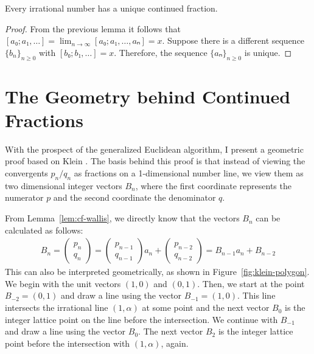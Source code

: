 \begin{theorem}
  \label{thm:irrat-cf}
  Every irrational number has a unique continued fraction.
\end{theorem}

\begin{proof}
  From the previous lemma it follows that $[a₀; a₁, …] = \lim_{n → ∞} [a₀; a₁, …, aₙ] = x$.
  Suppose there is a different sequence $\{b_n\}_{n ≥ 0}$ with $[b₀; b₁, …] = x$.
  Therefore, the sequence $\{aₙ\}_{n ≥ 0}$ is unique.
\end{proof}

\section{The Geometry behind Continued Fractions}

With the prospect of the generalized Euclidean algorithm, I present a geometric
proof based on Klein \cite{Klein95}.
The basis behind this proof is that instead of viewing the convergents $p_n/q_n$ as
fractions on a 1-dimensional number line,
we view them as two dimensional integer vectors $B_n$, where the first coordinate
represents the numerator $p$ and the second coordinate the denominator $q$.

From Lemma~\ref{lem:cf-wallis},
we directly know that the vectors $B_n$ can be calculated as follows:
\begin{align*}
  B_n =
  \begin{pmatrix}
    p_n \\ q_n
  \end{pmatrix}
  =
  \begin{pmatrix}
    p_{n-1} \\ q_{n-1}
  \end{pmatrix}
  a_n
  +
  \begin{pmatrix}
    p_{n-2} \\ q_{n-2}
  \end{pmatrix}
  = B_{n-1} a_n + B_{n-2}
\end{align*}
This can also be interpreted geometrically, as shown in Figure~\ref{fig:klein-polygon}.
We begin with the unit vectors $(1, 0)$ and $(0, 1)$.
Then, we start at the point $B_{-2} = (0, 1)$ and draw a line using the vector $B_{-1} = (1, 0)$.
This line intersects the irrational line $(1, α)$ at some point
and the next vector $B_0$ is the integer lattice point on the line before the
intersection.
We continue with $B_{-1}$ and draw a line using the vector $B_0$.
The next vector $B_2$ is the integer lattice point before the intersection with $(1, α)$, again.


